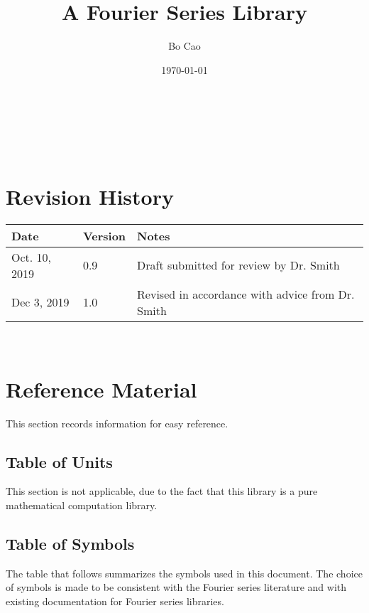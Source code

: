 \documentclass[12pt]{article}
\begin{document}
\title{\progname\\A Fourier Series Library} 
\author{Bo Cao}
\date{\today}
	
\maketitle

~\newpage


\tableofcontents

~\newpage

\section*{Revision History}

\begin{tabularx}{\textwidth}{p{3cm}p{2cm}X}
	\toprule {\bf Date} & {\bf Version} & {\bf Notes}\\
	\midrule
	Oct. 10, 2019 & 0.9 & Draft submitted for review by Dr. Smith\\
	Dec 3, 2019 & 1.0 & Revised in accordance with advice from Dr. Smith\\
	\bottomrule
\end{tabularx}

~\newpage

\section{Reference Material}

This section records information for easy reference.

\subsection{Table of Units}

This section is not applicable, due to the fact that this library is a pure mathematical computation library.

\subsection{Table of Symbols}

The table that follows summarizes the symbols used in this document. 
The choice of symbols is made to be consistent with the Fourier 
series literature and with existing documentation for Fourier series 
libraries.
\end{document}
